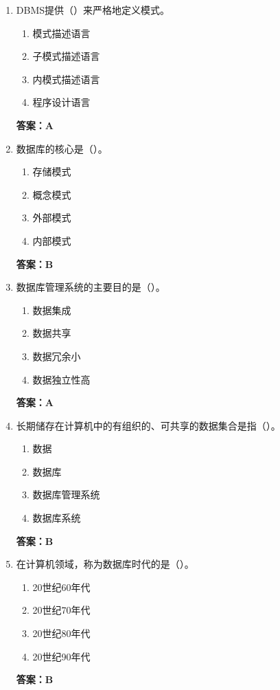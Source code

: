\documentclass[12pt, a4paper]{article}
\begin{document}
\begin{enumerate}[label=\arabic*.]
	\item DBMS提供（\quad）来严格地定义模式。
	      \begin{enumerate}
		      \item 模式描述语言
		      \item 子模式描述语言
		      \item 内模式描述语言
		      \item 程序设计语言
	      \end{enumerate}
	      \textbf{答案：A}

	\item 数据库的核心是（\quad）。
	      \begin{enumerate}
		      \item 存储模式
		      \item 概念模式
		      \item 外部模式
		      \item 内部模式
	      \end{enumerate}
	      \textbf{答案：B}

	\item 数据库管理系统的主要目的是（\quad）。
	      \begin{enumerate}
		      \item 数据集成
		      \item 数据共享
		      \item 数据冗余小
		      \item 数据独立性高
	      \end{enumerate}
	      \textbf{答案：A}

	\item 长期储存在计算机中的有组织的、可共享的数据集合是指（\quad）。
	      \begin{enumerate}
		      \item 数据
		      \item 数据库
		      \item 数据库管理系统
		      \item 数据库系统
	      \end{enumerate}
	      \textbf{答案：B}

	\item 在计算机领域，称为数据库时代的是（\quad）。
	      \begin{enumerate}
		      \item 20世纪60年代
		      \item 20世纪70年代
		      \item 20世纪80年代
		      \item 20世纪90年代
	      \end{enumerate}
	      \textbf{答案：B}


\end{enumerate}
\end{document}
